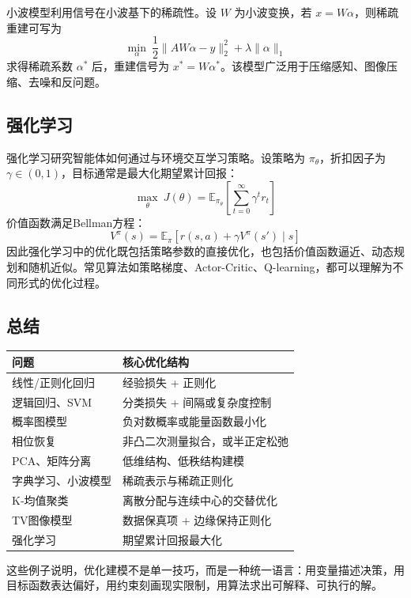 小波模型利用信号在小波基下的稀疏性。设 $W$ 为小波变换，若 $x=W\alpha$，则稀疏重建可写为
\[
\min_{\alpha}\ \frac{1}{2}\|AW\alpha-y\|_2^2+\lambda\|\alpha\|_1
\]
求得稀疏系数 $\alpha^*$ 后，重建信号为 $x^*=W\alpha^*$。该模型广泛用于压缩感知、图像压缩、去噪和反问题。

\subsection{强化学习}

强化学习研究智能体如何通过与环境交互学习策略。设策略为 $\pi_\theta$，折扣因子为 $\gamma\in(0,1)$，目标通常是最大化期望累计回报：
\[
\max_\theta\ J(\theta)=
\mathbb{E}_{\pi_\theta}\left[\sum_{t=0}^{\infty}\gamma^t r_t\right]
\]
价值函数满足Bellman方程：
\[
V^\pi(s)=\mathbb{E}_{\pi}\left[r(s,a)+\gamma V^\pi(s')\mid s\right]
\]
因此强化学习中的优化既包括策略参数的直接优化，也包括价值函数逼近、动态规划和随机近似。常见算法如策略梯度、Actor-Critic、Q-learning，都可以理解为不同形式的优化过程。

\subsection{总结}

\begin{conceptbox}[优化建模视角下的典型问题]
\begin{tabularx}{\textwidth}{@{}lX@{}}
\toprule
\textbf{问题} & \textbf{核心优化结构} \\
\midrule
线性/正则化回归 & 经验损失 + 正则化 \\
逻辑回归、SVM & 分类损失 + 间隔或复杂度控制 \\
概率图模型 & 负对数概率或能量函数最小化 \\
相位恢复 & 非凸二次测量拟合，或半正定松弛 \\
PCA、矩阵分离 & 低维结构、低秩结构建模 \\
字典学习、小波模型 & 稀疏表示与稀疏正则化 \\
K-均值聚类 & 离散分配与连续中心的交替优化 \\
TV图像模型 & 数据保真项 + 边缘保持正则化 \\
强化学习 & 期望累计回报最大化 \\
\bottomrule
\end{tabularx}
\end{conceptbox}

这些例子说明，优化建模不是单一技巧，而是一种统一语言：用变量描述决策，用目标函数表达偏好，用约束刻画现实限制，用算法求出可解释、可执行的解。

